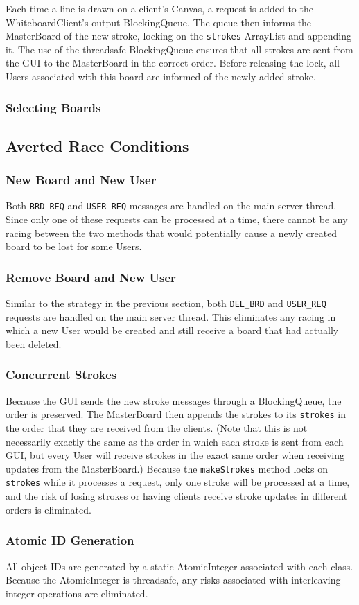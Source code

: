Each time a line is drawn on a client's Canvas, a request is added to the WhiteboardClient's output BlockingQueue. The queue then informs the MasterBoard of the new stroke, locking on the \texttt{strokes} ArrayList and appending it. The use of the threadsafe BlockingQueue ensures that all strokes are sent from the GUI to the MasterBoard in the correct order. Before releasing the lock, all Users associated with this board are informed of the newly added stroke.

\subsubsection{Selecting Boards}

\subsection{Averted Race Conditions}

\subsubsection{New Board and New User}

Both \texttt{BRD\_REQ} and \texttt{USER\_REQ} messages are handled on the main server thread. Since only one of these requests can be processed at a time, there cannot be any racing between the two methods that would potentially cause a newly created board to be lost for some Users. 

\subsubsection{Remove Board and New User}

Similar to the strategy in the previous section, both \texttt{DEL\_BRD} and \texttt{USER\_REQ} requests are handled on the main server thread. This eliminates any racing in which a new User would be created and still receive a board that had actually been deleted.

\subsubsection{Concurrent Strokes}

Because the GUI sends the new stroke messages through a BlockingQueue, the order is preserved. The MasterBoard then appends the strokes to its \texttt{strokes} in the order that they are received from the clients. (Note that this is not necessarily exactly the same as the order in which each stroke is sent from each GUI, but every User will receive strokes in the exact same order when receiving updates from the MasterBoard.) Because the \texttt{makeStrokes} method locks on \texttt{strokes} while it processes a request, only one stroke will be processed at a time, and the risk of losing strokes or having clients receive stroke updates in different orders is eliminated.

\subsubsection{Atomic ID Generation}

All object IDs are generated by a static AtomicInteger associated with each class. Because the AtomicInteger is threadsafe, any risks associated with interleaving integer operations are eliminated.